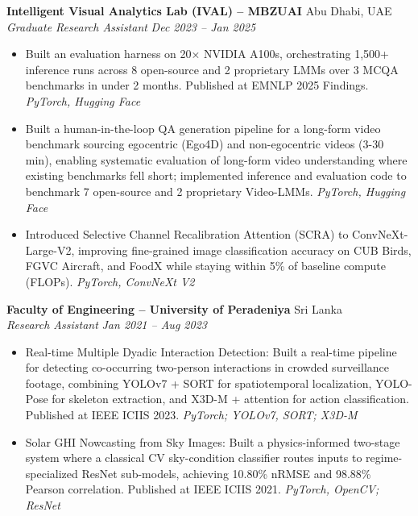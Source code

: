 \documentclass[10pt]{article}
\newcommand{\cventry}[2]{\textbf{#1} \hfill \textcolor{midtext}{#2} \\}
\newcommand{\cvrole}[2]{\textcolor{midtext}{\textit{#1}} \hfill \textcolor{midtext}{\textit{#2}} \\}
\newcommand{\stack}[1]{{\small\rmfamily\itshape\textcolor{stackgray}{#1}}}
\begin{document}
\cventry{Intelligent Visual Analytics Lab (IVAL) -- MBZUAI}{Abu Dhabi, UAE}
\cvrole{Graduate Research Assistant}{Dec 2023 -- Jan 2025}
\vspace{-7pt}
\begin{itemize}
    \item Built an evaluation harness on 20× NVIDIA A100s, orchestrating 1,500+ inference runs across 8 open-source and 2 proprietary LMMs over 3 MCQA benchmarks in under 2 months. Published at EMNLP 2025 Findings. \stack{PyTorch, Hugging Face}
    \item Built a human-in-the-loop QA generation pipeline for a long-form video benchmark sourcing egocentric (Ego4D) and non-egocentric videos (3-30 min), enabling systematic evaluation of long-form video understanding where existing benchmarks fell short; implemented inference and evaluation code to benchmark 7 open-source and 2 proprietary Video-LMMs. \stack{PyTorch, Hugging Face}
    \item Introduced Selective Channel Recalibration Attention (SCRA) to ConvNeXt-Large-V2, improving fine-grained image classification accuracy on CUB Birds, FGVC Aircraft, and FoodX while staying within 5\% of baseline compute (FLOPs). \stack{PyTorch, ConvNeXt V2}
\end{itemize}
\newpage
\cventry{Faculty of Engineering -- University of Peradeniya}{Sri Lanka}
\cvrole{Research Assistant}{Jan 2021 -- Aug 2023}
\vspace{-7pt}
\begin{itemize}
    \item Real-time Multiple Dyadic Interaction Detection: Built a real-time pipeline for detecting co-occurring two-person interactions in crowded surveillance footage, combining YOLOv7 + SORT for spatiotemporal localization, YOLO-Pose for skeleton extraction, and X3D-M + attention for action classification. Published at IEEE ICIIS 2023. \stack{PyTorch; YOLOv7, SORT; X3D-M}
    \item Solar GHI Nowcasting from Sky Images: Built a physics-informed two-stage system where a classical CV sky-condition classifier routes inputs to regime-specialized ResNet sub-models, achieving 10.80\% nRMSE and 98.88\% Pearson correlation. Published at IEEE ICIIS 2021. \stack{PyTorch, OpenCV; ResNet}
\end{itemize}

\vspace{4pt}



\end{document}
